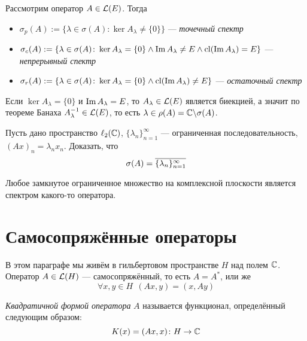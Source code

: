 \begin{definition}
	Рассмотрим оператор $A \in \mathcal{L}(E)$. Тогда
	\begin{itemize}
		\item $\sigma_p(A) := \{\lambda \in \sigma(A) \colon \ker A_\lambda \neq \{0\}\}$ --- \textit{точечный спектр}
		
		\item $\sigma_c(A) := \{\lambda \in \sigma(A) \colon \ker A_\lambda = \{0\} \wedge \operatorname{Im} A_\lambda \neq E \wedge \operatorname{cl} (\operatorname{Im} A_\lambda) = E\}$ --- \textit{непрерывный спектр}
		
		\item $\sigma_r(A) := \{\lambda \in \sigma(A) \colon \ker A_\lambda = \{0\} \wedge \operatorname{cl} (\operatorname{Im} A_\lambda) \neq E\}$ --- \textit{остаточный спектр}
	\end{itemize}
\end{definition}

\begin{note}
	Если $\ker A_\lambda = \{0\}$ и  $\operatorname{Im} A_\lambda = E$, то $A_\lambda \in \mathcal{L}(E)$ является биекцией, а значит по теореме Банаха $A_\lambda^{-1} \in \mathcal{L}(E)$, то есть $\lambda \in \rho(A) = \mathbb{C} \backslash \sigma(A)$.
\end{note}
	
\begin{exercise}
	Пусть дано пространство $\ell_2(\mathbb{C})$, $\{\lambda_n\}_{n = 1}^\infty$ --- ограниченная последовательность, $(Ax)_n = \lambda_nx_n$. Доказать, что
	\[
		\sigma(A) = \overline{\{\lambda_n\}_{n = 1}^\infty}
	\]
\end{exercise}

\begin{corollary}
	Любое замкнутое ограниченное множество на комплексной плоскости является спектром какого-то оператора.
\end{corollary}

\section{Самосопряжённые операторы}

\begin{note}
	В этом параграфе мы живём в гильбертовом пространстве $H$ над полем $\mathbb{C}$. Оператор $A \in \mathcal{L}(H)$ --- самосопряжённый, то есть $A = A^*$, или же
	\[
		\forall x, y \in H\ \ (Ax, y) = (x, Ay)
	\]
\end{note}

\begin{definition}
	\textit{Квадратичной формой оператора} $A$ называется функционал, определённый следующим образом:
	\[
		K(x) = (Ax, x) \colon H \to \mathbb{C}
	\]
\end{definition}

